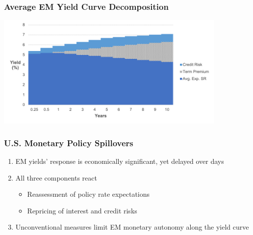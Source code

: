 \documentclass[12pt, aspectratio=169, xcolor=dvipsnames]{beamer}
\begin{document}
\begin{frame}
\frametitle{Average EM Yield Curve Decomposition}
\begin{center}
	\includegraphics[trim={0cm 0cm 0.1cm 0cm},clip,width=0.85\textwidth,height=0.95\textheight]{../Figures/Slides/Yield_Dcmp_EM.png}
\end{center}
\end{frame}


\begin{frame}
	\frametitle{U.S. Monetary Policy Spillovers}
	\begin{enumerate}
		\item EM yields' response is economically significant, yet delayed over days
		\newline
		\item All three components react
		\begin{itemize}
			\item Reassessment of policy rate expectations
			\item Repricing of interest and credit risks
			\newline
		\end{itemize} 
		\item Unconventional measures limit EM monetary autonomy along the yield curve
	\end{enumerate}
\end{frame}
\end{document}

